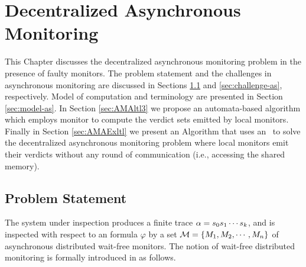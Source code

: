 \chapter{Decentralized Asynchronous Monitoring}
\label{chap:DAM}






This Chapter discusses the decentralized asynchronous monitoring problem in the presence of faulty monitors. The problem statement and the challenges in asynchronous monitoring are discussed in Sections \ref{sec:PSa} and \ref{sec:challenge-as}, respectively. Model of computation and terminology are presented in Section \ref{sec:model-as}. In Section \ref{sec:AMAltl3} we propose an automata-based algorithm which employs \LTLtri monitor to compute the verdict sets emitted by local monitors. Finally in Section \ref{sec:AMAExltl} we present an Algorithm that uses an \Exltl~to solve the decentralized asynchronous monitoring problem where local monitors emit their verdicts without any round of communication (i.e., accessing the shared memory).




\iffalse
We present an algorithm for asynchronous distributed fault-tolerant RV, where the monitors are asynchronous wait-free processes that any of them can fail by crashing. Similar to our synchronous model (Section \ref{sec:DSM}), each local monitor obtains a partial view (i.e., a concrete local state) of the system's global state. It communicates with other monitors through a shared memory and updates its knowledge, and then solely based on its partial view, emits a final verdict. We show how, given any \LTL formula and an \Exltl, a set of verdicts collectively provided by the local monitors can be used to compute the verdict computed by a centralized monitor that has full view of the system under scrutiny.
\fi



\section{Problem Statement}
\label{sec:PSa}

The system under inspection produces a finite trace $\alpha = s_0 s_1 \cdots s_k$, and is inspected with respect to an \LTL formula $\varphi$ by a set $\mathcal{M} = \{ M_1, M_2, \cdots , M_n \}$ of asynchronous distributed wait-free monitors. The notion of wait-free distributed monitoring is formally introduced in \cite{bfrrt16} as follows.


